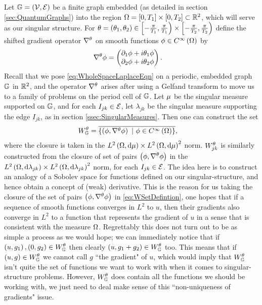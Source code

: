 Let $\mathbb{G}=\left( \mathcal{V},\mathcal{E} \right)$ be a finite graph embedded (as detailed in section \ref{sec:QuantumGraphs}) into the region $\Omega=\left[ 0,T_1 \right]\times\left[ 0,T_2 \right]\subset\mathbb{R}^2$, which will serve as our singular structure.
For $\theta=\left( \theta_1,\theta_2 \right)\in\left[-\frac{\pi}{T_1},\frac{\pi}{T_1}\right)\times\left[-\frac{\pi}{T_2},\frac{\pi}{T_2}\right)$ define the shifted gradient operator $\nabla^{\theta}$ on smooth functions $\phi\in C^{\infty}\left( \Omega \right)$ by
\begin{align*}
	\nabla^{\theta}\phi &= \begin{pmatrix} \partial_1\phi + i\theta_1\phi \\ \partial_2\phi + i\theta_2\phi \end{pmatrix}.
\end{align*}
Recall that we pose \eqref{eq:WholeSpaceLaplaceEqn} on a periodic, embedded graph $\mathbb{G}$ in $\mathbb{R}^2$, and the operator $\nabla^{\theta}$ arises after using a Gelfand transform to move us to a family of problems on the period cell of $\mathbb{G}$.
Let $\mu$ be the singular measure supported on $\mathbb{G}$, and for each $I_{jk}\in \mathcal{E}$, let $\lambda_{jk}$ be the singular measure supporting the edge $I_{jk}$, as in section \ref{ssec:SingularMeasures}.
Then one can construct the set
\begin{align} \label{eq:WSetDefintion}
	W^{\theta}_{\mathbb{G}} &= \overline{ \left\{  \left( \phi, \nabla^{\theta}\phi \right) \ \vert \ \phi\in C^{\infty}\left( \Omega \right)  \right\} },
\end{align}
where the closure is taken in the $L^{2}\left( \Omega,\mathrm{d}\mu \right)\times L^{2}\left( \Omega,\mathrm{d}\mu \right)^2$ norm.
$W^{\theta}_{jk}$ is similarly constructed from the closure of set of pairs $\left( \phi, \nabla^{\theta}\phi \right)$ in the $L^{2}\left( \Omega,\mathrm{d}\lambda_{jk} \right)\times L^{2}\left( \Omega,\mathrm{d}\lambda_{jk} \right)^2$ norm, for each $I_{jk}\in\mathcal{E}$.
The idea here is to construct an analogy of a Sobolev space for functions defined on our singular-structure, and hence obtain a concept of (weak) derivative.
This is the reason for us taking the closure of the set of pairs $\left( \phi, \nabla^{\theta}\phi \right)$ in \eqref{eq:WSetDefintion}, one hopes that if a sequence of smooth functions converges in $L^2$ to $u$, then their gradients also converge in $L^2$ to a function that represents the gradient of $u$ in a sense that is consistent with the measure $\Omega$.
Regrettably this does not turn out to be as simple a process as we would hope; we can immediately notice that if $\left( u,g_1 \right),\left( 0,g_2 \right)\in W^{\theta}_{\mathbb{G}}$ then clearly $\left( u, g_1+g_2 \right)\in W^{\theta}_{\mathbb{G}}$ too.
This means that if $\left( u,g \right)\in W^{\theta}_{\mathbb{G}}$ we cannot call $g$ ``the gradient" of $u$, which would imply that $W^{\theta}_{\mathbb{G}}$ isn't quite the set of functions we want to work with when it comes to singular-structure problems.
However, $W^{\theta}_{\mathbb{G}}$ does contain all the functions we should be working with, we just need to deal make sense of this ``non-uniqueness of gradients" issue. \newline

